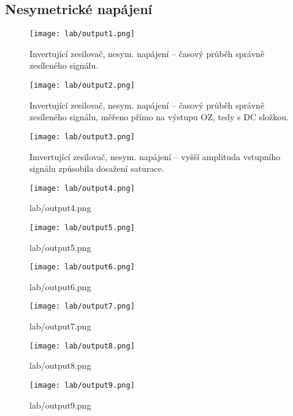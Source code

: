 \subsection{Nesymetrické napájení}
\begin{figure}[h!]
    \centering
    \texttt{[image: lab/output1.png]}
    \caption{Invertující zesilovač, nesym. napájení -- časový průběh správně zesíleného signálu.}
    \label{fig:lab/output1.png}
\end{figure}

\begin{figure}[h!]
    \centering
    \texttt{[image: lab/output2.png]}
    \caption{Invertující zesilovač, nesym. napájení -- časový průběh správně zesíleného signálu, měřeno přímo na výstupu OZ, tedy s DC složkou.}
    \label{fig:lab-output2-png}
\end{figure}

\begin{figure}[h!]
    \centering
    \texttt{[image: lab/output3.png]}
    \caption{Imvertující zesilovač, nesym. napájení -- vyšší amplituda vstupního signálu způsobila dosažení saturace.}
    \label{fig:lab-output3-png}
\end{figure}

\begin{figure}[h!]
    \centering
    \texttt{[image: lab/output4.png]}
    \caption{lab/output4.png}
    \label{fig:lab-output4-png}
\end{figure}

\begin{figure}[h!]
    \centering
    \texttt{[image: lab/output5.png]}
    \caption{lab/output5.png}
    \label{fig:lab-output5-png}
\end{figure}

\begin{figure}[h!]
    \centering
    \texttt{[image: lab/output6.png]}
    \caption{lab/output6.png}
    \label{fig:lab-output6-png}
\end{figure}

\begin{figure}[h!]
    \centering
    \texttt{[image: lab/output7.png]}
    \caption{lab/output7.png}
    \label{fig:lab-output7-png}
\end{figure}

\begin{figure}[h!]
    \centering
    \texttt{[image: lab/output8.png]}
    \caption{lab/output8.png}
    \label{fig:lab-output8-png}
\end{figure}

\begin{figure}[h!]
    \centering
    \texttt{[image: lab/output9.png]}
    \caption{lab/output9.png}
    \label{fig:lab-output9-png}
\end{figure}

